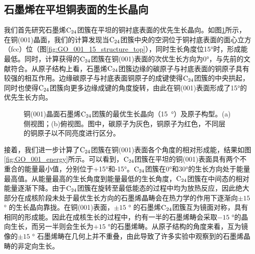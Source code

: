     \subsection{石墨烯在平坦铜表面的生长晶向}
        我们首先研究石墨烯$\rm{C_{24}}$团簇在平坦的铜衬底表面的优先生长晶向。如图\ref{fig:GO_001_15_structure}所示，在铜(001)晶面，我们的计算发现当$\rm{C_{24}}$团簇中央的空洞位于铜衬底表面的面心立方（fcc）位（图\ref{fig:GO_001_15_structure_top}），同时生长角度位15\si{\degree}时，形成能最低。同时，计算获得的$\rm{C_{24}}$团簇在铜(001)表面的次优生长方向为0\si{\degree}，与先前的文献符合。从原子结构上看，石墨烯$\rm{C_{24}}$团簇边缘的碳原子与衬底表面的铜原子具有较强的相互作用。边缘碳原子与衬底表面铜原子的成键使得$\rm{C_{24}}$团簇的中央拱起，同时也使得$\rm{C_{24}}$团簇向更多边缘成键的角度旋转，由此在铜(001)表面形成了15\si{\degree}的优先生长方向。

        \begin{figure}[htb]

            \caption{铜(001)晶面石墨烯$\rm{C_{24}}$团簇的最优生长晶向（\SI{15}{\degree}）及原子构型。(a)侧视图；(b)俯视图。图中，碳原子为灰色，铜原子为红色，不同层的铜原子以不同亮度进行区分。}
            \label{fig:GO_001_15_structure}
        \end{figure}

        接着，我们进一步计算了$\rm{C_{24}}$团簇在铜(001)表面各个角度的相对形成能，结果如图\ref{fig:GO_001_energy}所示。可以看到，$\rm{C_{24}}$团簇在平坦的铜(001)表面具有两个不重合的能量最小值，分别位于+15\si{\degree}和-15\si{\degree}。$\rm{C_{24}}$团簇在0\si{\degree}和30\si{\degree}的生长方向处于能量最高值。从能量最高的生长角度到能量最低的生长角度，$\rm{C_{24}}$团簇在中间态的相对能量逐渐下降。由于$\rm{C_{24}}$团簇在旋转至最低能态的过程中均为放热反应，因此绝大部分在成核阶段未处于最优生长方向的石墨烯晶畴会在热力学的作用下逐渐向$\pm 15$ \si{\degree} 的生长晶向靠拢。在铜(001)表面，$\pm 15$ \si{\degree} 的石墨烯$\rm{C_{24}}$团簇互为镜面对称，具有相同的形成能。因此在成核生长的过程中，约有一半的石墨烯畴会采取$-15$ \si{\degree}的晶向生长，而另一半则会生长为$+15$ \si{\degree}的石墨烯畴。从原子结构的角度来看，互为镜像的$\pm 15$ \si{\degree} 石墨烯畴在几何上并不重叠，由此导致了许多实验中观察到的石墨烯晶畴的非定向生长。

